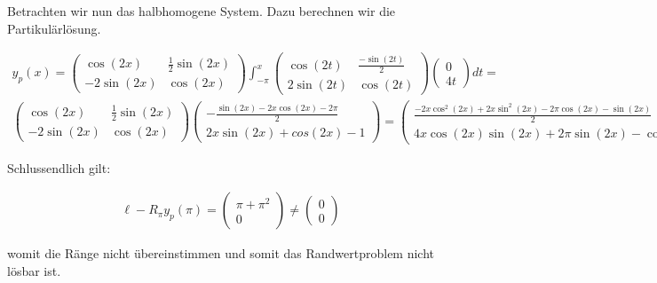 \begin{solution}
\begin{enumerate}[label = \textbf{\alph*)}]
  Betrachten wir nun das halbhomogene System. Dazu berechnen wir die Partikulärlösung.

  \begin{align*}
    y_p(x)
    =
    \begin{pmatrix}
    \cos(2x) & \frac{1}{2}\sin(2x) \\
    -2\sin(2x) & \cos(2x)
    \end{pmatrix}
    \int_{-\pi}^x \begin{pmatrix}
      \cos(2t) & \frac{-\sin(2t)}{2} \\
      2\sin(2t) & \cos(2t)
    \end{pmatrix}
    \begin{pmatrix}
      0 \\
      4t
    \end{pmatrix}
    dt = \\
    \begin{pmatrix}
    \cos(2x) & \frac{1}{2}\sin(2x) \\
    -2\sin(2x) & \cos(2x)
    \end{pmatrix}
    \begin{pmatrix}
      -\frac{\sin(2x)-2x\cos(2x) - 2\pi}{2} \\
      2x\sin(2x)+cos(2x)-1
    \end{pmatrix}
    =
    \begin{pmatrix}
      \frac{-2x\cos^2(2x)+2x\sin^2(2x)-2\pi \cos(2x)-\sin(2x)}{2} \\
      4x \cos(2x)\sin(2x) + 2\pi \sin(2x)-\cos(2x) + 1
    \end{pmatrix}
  \end{align*}

  Schlussendlich gilt:

  \begin{align*}
    \ell - R_\pi y_p(\pi)=
    \begin{pmatrix}
      \pi + \pi^2 \\
      0
    \end{pmatrix}
    \neq
    \begin{pmatrix}
      0 \\ 0
    \end{pmatrix}
  \end{align*}

    womit die Ränge nicht übereinstimmen und somit das Randwertproblem nicht lösbar ist.
    

\end{enumerate}
\end{solution}
